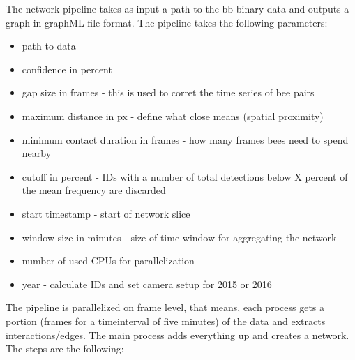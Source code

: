 The network pipeline takes as input a path to the bb-binary data and outputs a graph in graphML file format. The pipeline takes the following parameters:

\begin{itemize}
\item path to data
\item confidence in percent
\item gap size in frames - this is used to corret the time series of bee pairs
\item maximum distance in px - define what close means (spatial proximity)
\item minimum contact duration in frames - how many frames bees need to spend nearby
\item cutoff in percent - IDs with a number of total detections below X percent of the mean frequency are discarded 
\item start timestamp - start of network slice
\item window size in minutes - size of time window for aggregating the network
\item number of used CPUs for parallelization
\item year - calculate IDs and set camera setup for 2015 or 2016
\end{itemize}

The pipeline is parallelized on frame level, that means, each process gets a portion (frames for a timeinterval of five minutes) of the data and extracts interactions/edges. The main process adds everything up and creates a network.
The steps are the following:

